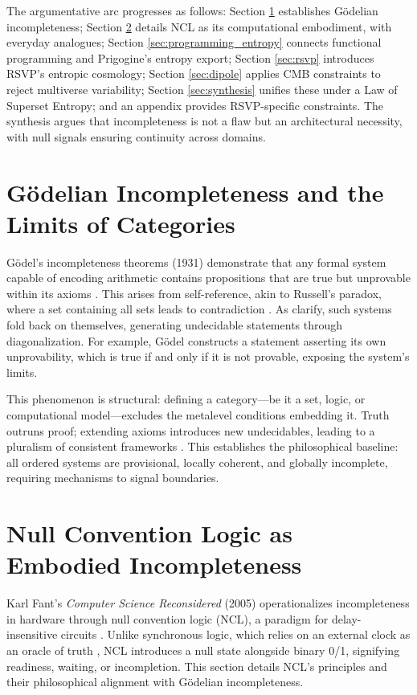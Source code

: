 \documentclass{article}
\begin{document}
The argumentative arc progresses as follows: Section \ref{sec:godel} establishes Gödelian incompleteness; Section \ref{sec:ncl} details NCL as its computational embodiment, with everyday analogues; Section \ref{sec:programming_entropy} connects functional programming and Prigogine's entropy export; Section \ref{sec:rsvp} introduces RSVP's entropic cosmology; Section \ref{sec:dipole} applies CMB constraints to reject multiverse variability; Section \ref{sec:synthesis} unifies these under a Law of Superset Entropy; and an appendix provides RSVP-specific constraints. The synthesis argues that incompleteness is not a flaw but an architectural necessity, with null signals ensuring continuity across domains.

\section{Gödelian Incompleteness and the Limits of Categories}
\label{sec:godel}
Gödel's incompleteness theorems (1931) demonstrate that any formal system capable of encoding arithmetic contains propositions that are true but unprovable within its axioms \citep{godel1931}. This arises from self-reference, akin to Russell's paradox, where a set containing all sets leads to contradiction \citep{tarski1956}. As \citet{nagel1958} clarify, such systems fold back on themselves, generating undecidable statements through diagonalization. For example, Gödel constructs a statement asserting its own unprovability, which is true if and only if it is not provable, exposing the system's limits.

This phenomenon is structural: defining a category—be it a set, logic, or computational model—excludes the metalevel conditions embedding it. Truth outruns proof; extending axioms introduces new undecidables, leading to a pluralism of consistent frameworks \citep{tarski1956}. This establishes the philosophical baseline: all ordered systems are provisional, locally coherent, and globally incomplete, requiring mechanisms to signal boundaries.

\section{Null Convention Logic as Embodied Incompleteness}
\label{sec:ncl}
Karl Fant's \textit{Computer Science Reconsidered} (2005) operationalizes incompleteness in hardware through null convention logic (NCL), a paradigm for delay-insensitive circuits \citep{fant2005}. Unlike synchronous logic, which relies on an external clock as an oracle of truth \citep{seitz1980}, NCL introduces a null state alongside binary 0/1, signifying readiness, waiting, or incompletion. This section details NCL's principles and their philosophical alignment with Gödelian incompleteness.
\end{document}
